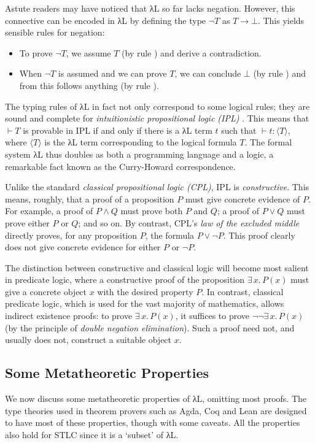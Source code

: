 \documentclass{article}
\theoremstyle{definition}
\newcommand{\Ex}[2]{∃\,#1.\, #2}
\newcommand{\lbl}[1]{\RightTirNameStyle{#1}}
\begin{document}
Astute readers may have noticed that λL so far lacks negation.
However, this connective can be encoded in λL by defining the type $¬ T$ as $T → ⊥$.
This yields sensible rules for negation:
\begin{itemize}
  \item To prove $¬ T$, we assume $T$ (by rule \lbl{Abs}) and derive a contradiction.
  \item When $¬ T$ is assumed and we can prove $T$, we can conclude $⊥$ (by rule \lbl{App}) and from this follows anything (by rule \lbl{Absurd}).
\end{itemize}

The typing rules of λL in fact not only correspond to some logical rules; they are sound and complete for \emph{intuitionistic propositional logic (IPL)} .
This means that $⊢ T$ is provable in IPL if and only if there is a λL term $t$ such that $⊢ t : ⟨T⟩$, where $⟨T⟩$ is the λL term corresponding to the logical formula $T$.
The formal system λL thus doubles as both a programming language and a logic, a remarkable fact known as the Curry-Howard correspondence.

Unlike the standard \emph{classical propositional logic (CPL)}, IPL is \emph{constructive}.
This means, roughly, that a proof of a proposition $P$ must give concrete evidence of $P$.
For example, a proof of $P ∧ Q$ must prove both $P$ and $Q$; a proof of $P ∨ Q$ must prove either $P$ or $Q$; and so on.
By contrast, CPL's \emph{law of the excluded middle} directly proves, for any proposition $P$, the formula $P ∨ ¬ P$.
This proof clearly does not give concrete evidence for either $P$ or $¬ P$.

The distinction between constructive and classical logic will become most salient in predicate logic, where a constructive proof of the proposition $\Ex{x}{P(x)}$ must give a concrete object $x$ with the desired property $P$.
In contrast, classical predicate logic, which is used for the vast majority of mathematics, allows indirect existence proofs:
to prove $\Ex{x}{P(x)}$, it suffices to prove $¬¬ \Ex{x}{P(x)}$ (by the principle of \emph{double negation elimination}).
Such a proof need not, and usually does not, construct a suitable object $x$.

\subsection{Some Metatheoretic Properties}

We now discuss some metatheoretic properties of λL, omitting most proofs.
The type theories used in theorem provers such as Agda, Coq and Lean are designed to have most of these properties, though with some caveats.
All the properties also hold for STLC since it is a \enquote*{subset} of λL.
\end{document}
